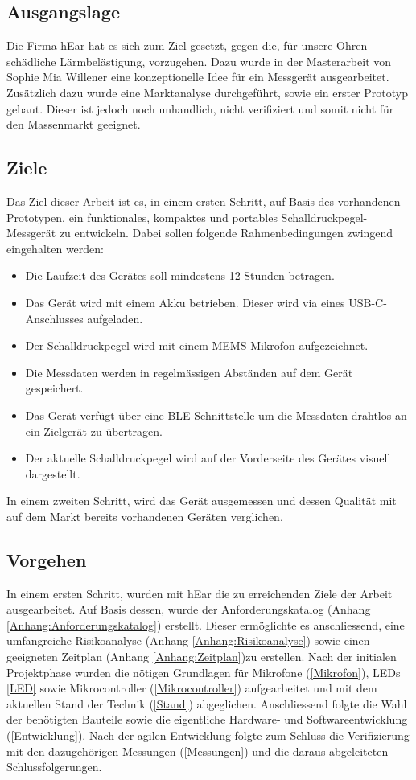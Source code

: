 \documentclass[12pt]{article}
\begin{document}
	\subsection{Ausgangslage} \label{Ausgangslage}
	Die Firma hEar hat es sich zum Ziel gesetzt, gegen die, für unsere Ohren schädliche Lärmbelästigung, vorzugehen. Dazu wurde in der Masterarbeit von Sophie Mia Willener eine konzeptionelle Idee für ein Messgerät ausgearbeitet. Zusätzlich dazu wurde eine Marktanalyse durchgeführt, sowie ein erster Prototyp gebaut. Dieser ist jedoch noch unhandlich, nicht verifiziert und somit nicht für den Massenmarkt geeignet. 
	\subsection{Ziele} \label{Ziele}
	Das Ziel dieser Arbeit ist es, in einem ersten Schritt, auf Basis des vorhandenen Prototypen, ein funktionales, kompaktes und portables Schalldruckpegel-Messgerät zu entwickeln. Dabei sollen folgende Rahmenbedingungen zwingend eingehalten werden:
	\begin{itemize}
		\item Die Laufzeit des Gerätes soll mindestens 12 Stunden betragen.
		\item Das Gerät wird mit einem Akku betrieben. Dieser wird via eines USB-C-Anschlusses aufgeladen.
		\item Der Schalldruckpegel wird mit einem MEMS-Mikrofon aufgezeichnet.
		\item Die Messdaten werden in regelmässigen Abständen auf dem Gerät gespeichert.
		\item Das Gerät verfügt über eine BLE-Schnittstelle um die Messdaten drahtlos an ein Zielgerät zu übertragen.
		\item Der aktuelle Schalldruckpegel wird auf der Vorderseite des Gerätes visuell dargestellt.
	\end{itemize}
	In einem zweiten Schritt, wird das Gerät ausgemessen und dessen Qualität mit auf dem Markt bereits vorhandenen Geräten verglichen.
	\subsection{Vorgehen}
	In einem ersten Schritt, wurden mit hEar die zu erreichenden Ziele der Arbeit ausgearbeitet. Auf Basis dessen, wurde der Anforderungskatalog (Anhang \ref{Anhang:Anforderungskatalog}) erstellt. Dieser ermöglichte es anschliessend, eine umfangreiche Risikoanalyse (Anhang \ref{Anhang:Risikoanalyse}) sowie einen geeigneten Zeitplan (Anhang \ref{Anhang:Zeitplan})zu erstellen. Nach der initialen Projektphase wurden die nötigen Grundlagen für Mikrofone (\ref{Mikrofon}), LEDs \ref{LED} sowie Mikrocontroller (\ref{Mikrocontroller}) aufgearbeitet und mit dem aktuellen Stand der Technik (\ref{Stand}) abgeglichen. Anschliessend folgte die Wahl der benötigten Bauteile sowie die eigentliche Hardware- und Softwareentwicklung (\ref{Entwicklung}). Nach der agilen Entwicklung folgte zum Schluss die Verifizierung mit den dazugehörigen Messungen (\ref{Messungen}) und die daraus abgeleiteten Schlussfolgerungen. \\
	
\end{document}
